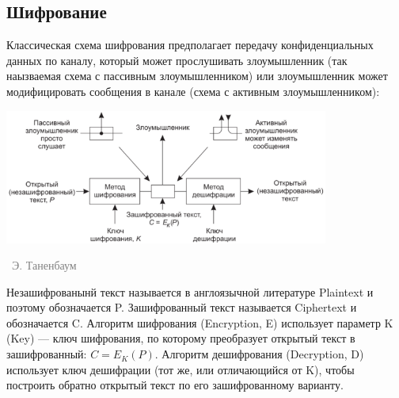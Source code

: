 \documentclass[a5paper]{article}
\newcommand{\attribution}[1] {
\vspace{-5mm}\begin{flushright}\begin{scriptsize}\textcolor{gray}{\textcopyright\, #1}\end{scriptsize}\end{flushright}
}
\begin{document}
\subsection{Шифрование}

Классическая схема шифрования предполагает передачу конфиденциальных данных по каналу, который может прослушивать злоумышленник (так наызваемая схема с пассивным злоумышленником) или злоумышленник может модифицировать сообщения в канале (схема с активным злоумышленником):

\begin{center}
    \includegraphics[width=0.8\textwidth]{cryptography.png}
    \attribution{Э. Таненбаум}
\end{center}

Незашифрованынй текст называется в англоязычной литературе Plaintext и поэтому обозначается P. Зашифрованный текст называется Ciphertext и обозначается C. Алгоритм шифрования (Encryption, E) использует параметр K (Key) --- ключ шифрования, по которому преобразует открытый текст в зашифрованный: $C = E_K(P)$. Алгоритм дешифрования (Decryption, D) использует ключ дешифрации (тот же, или отличающийся от K), чтобы построить обратно открытый текст по его зашифрованному варианту.
\end{document}
